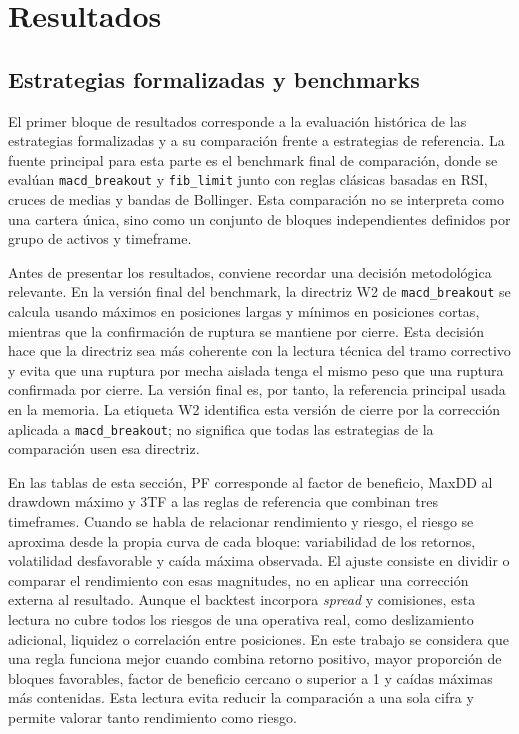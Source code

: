 
\raggedbottom

\section{Resultados}
\label{sec:resultados-principales}

\subsection{Estrategias formalizadas y benchmarks}
\label{subsec:resultados-estrategias-benchmarks}

El primer bloque de resultados corresponde a la evaluaci\'on hist\'orica de las
estrategias formalizadas y a su comparaci\'on frente a estrategias de
referencia. La fuente principal para esta parte es el benchmark final de
comparaci\'on, donde se eval\'uan \texttt{macd\_breakout} y \texttt{fib\_limit}
junto con reglas cl\'asicas basadas en RSI, cruces de medias y bandas de
Bollinger. Esta comparaci\'on no se interpreta como una cartera \'unica, sino
como un conjunto de bloques independientes definidos por grupo de activos y
timeframe.

Antes de presentar los resultados, conviene recordar una decisi\'on
metodol\'ogica relevante. En la versi\'on final del benchmark, la directriz W2 de
\texttt{macd\_breakout} se calcula usando m\'aximos en posiciones largas y
m\'inimos en posiciones cortas, mientras que la confirmaci\'on de ruptura se
mantiene por cierre. Esta decisi\'on hace que la directriz sea m\'as coherente con
la lectura t\'ecnica del tramo correctivo y evita que una ruptura por mecha
aislada tenga el mismo peso que una ruptura confirmada por cierre. La versi\'on
final es, por tanto, la referencia principal usada en la memoria. La etiqueta
W2 identifica esta versi\'on de cierre por la correcci\'on aplicada a
\texttt{macd\_breakout}; no significa que todas las estrategias de la
comparaci\'on usen esa directriz.

En las tablas de esta secci\'on, PF corresponde al factor de beneficio, MaxDD al
drawdown m\'aximo y 3TF a las reglas de referencia que combinan tres timeframes.
Cuando se habla de relacionar rendimiento y riesgo, el riesgo se aproxima desde
la propia curva de cada bloque: variabilidad de los retornos, volatilidad
desfavorable y ca\'ida m\'axima observada. El ajuste consiste en dividir o
comparar el rendimiento con esas magnitudes, no en aplicar una correcci\'on
externa al resultado. Aunque el backtest incorpora \textit{spread} y
comisiones, esta lectura no cubre todos los riesgos de una operativa real, como
deslizamiento adicional, liquidez o correlaci\'on entre posiciones.
En este trabajo se considera que una regla funciona mejor cuando combina retorno
positivo, mayor proporci\'on de bloques favorables, factor de beneficio cercano o
superior a 1 y ca\'idas m\'aximas m\'as contenidas. Esta lectura evita reducir la
comparaci\'on a una sola cifra y permite valorar tanto rendimiento como riesgo.

